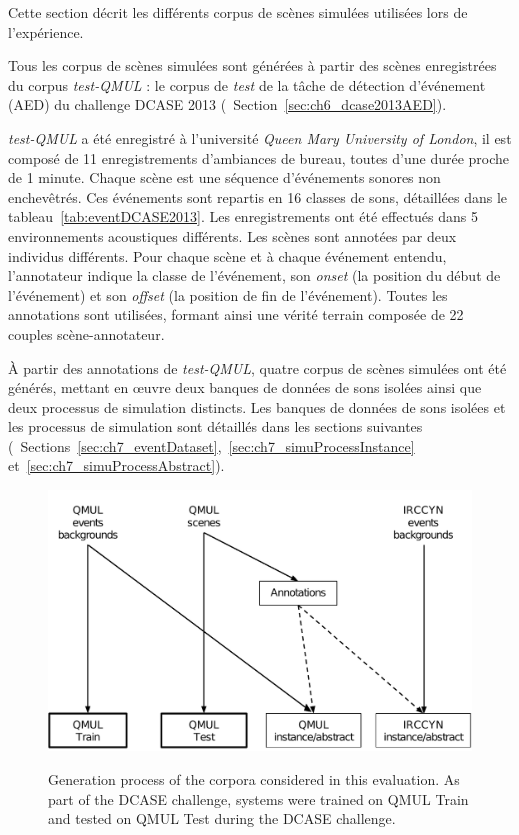 Cette section décrit les différents corpus de scènes simulées utilisées lors de l'expérience. 

Tous les corpus  de scènes simulées sont générées à partir des scènes enregistrées du corpus \emph{test-QMUL} : le corpus de \emph{test} de la tâche de détection d'événement (AED) du challenge DCASE 2013  \citep{giannoulis2013detection} (\cf~Section~\ref{sec:ch6_dcase2013AED}). 

\emph{test-QMUL} a été enregistré à l'université \emph{Queen Mary University of London}, il est composé de 11 enregistrements d'ambiances de bureau, toutes d'une durée proche de 1 minute. Chaque scène est une séquence  d'événements sonores non enchevêtrés. Ces événements sont repartis en 16 classes de sons, détaillées dans le tableau~\ref{tab:eventDCASE2013}. Les enregistrements ont été effectués dans 5 environnements acoustiques différents. Les scènes sont annotées par deux individus différents. Pour chaque scène et à chaque événement entendu, l'annotateur indique la classe de l'événement, son \emph{onset} (la position du début de l'événement) et son \emph{offset} (la position de fin de l'événement).  Toutes les annotations sont utilisées, formant ainsi une vérité terrain composée de 22 couples scène-annotateur.


À partir des annotations de \emph{test-QMUL}, quatre corpus de scènes simulées ont été générés, mettant en œuvre deux banques de données de sons isolées ainsi que deux processus de simulation distincts. Les banques de données de sons isolées et les processus de simulation sont détaillés dans les sections suivantes (\cf~Sections~\ref{sec:ch7_eventDataset},~\ref{sec:ch7_simuProcessInstance} et~\ref{sec:ch7_simuProcessAbstract}). 

\begin{figure}[t]
\begin{center}
\includegraphics[width=1\textwidth]{gfx/ch_7/databasesTasslp.pdf}
\label{fig:databasesDCASE2013Simu}
\caption{Generation process of the corpora considered in this evaluation. As part of the DCASE challenge, systems were trained on QMUL Train and tested on QMUL Test during the DCASE challenge.} 
\end{center}
\end{figure}

